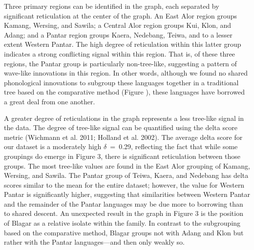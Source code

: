 {%
 \par}

Three primary regions can be identified in the graph, each separated by significant reticulation at the center of the graph. An East Alor region groups Kamang, Wersing, and Sawila; a Central Alor region groups Kui, Klon, and Adang; and a Pantar region groups Kaera, Nedebang, Teiwa, and to a lesser extent Western Pantar. The high degree of reticulation within this latter group indicates a strong conflicting signal within this region. That is, of these three regions, the Pantar group is particularly non-tree-like, suggesting a pattern of wave-like innovations in this region. In other words, although we found no shared phonological innovations to subgroup these languages together in a traditional tree based on the comparative method (Figure ), these languages have borrowed a great deal from one another. 

A greater degree of reticulations in the graph represents a less tree-like signal in the data. The degree of tree-like signal can be quantified using the delta score metric (Wichmann et al. 2011; Holland et al. 2002). The average delta score for our dataset is a moderately high $\delta $~=~0.29, reflecting the fact that while some groupings do emerge in Figure 3, there is significant reticulation between those groups. The most tree-like values are found in the East Alor grouping of Kamang, Wersing, and Sawila. The Pantar group of Teiwa, Kaera, and Nedebang has delta scores similar to the mean for the entire dataset; however, the value for Western Pantar is significantly higher, suggesting that similarities between Western Pantar and the remainder of the Pantar languages may be due more to borrowing than to shared descent. An unexpected result in the graph in Figure 3 is the position of Blagar as a relative isolate within the family. In contrast to the subgrouping based on the comparative method, Blagar 
groups not with Adang and Klon but rather with the Pantar languages---and then only weakly so. 

